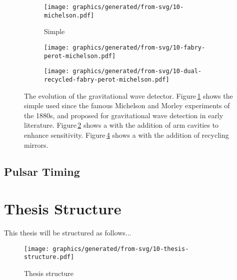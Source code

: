 \begin{figure}
  \begin{center}
    \begin{subfigure}{.3\textwidth}
      \texttt{[image: graphics/generated/from-svg/10-michelson.pdf]}
      \caption{Simple \MI}
      \label{fig:mi}
    \end{subfigure}
    \hfill
    \begin{subfigure}{.3\textwidth}
      \texttt{[image: graphics/generated/from-svg/10-fabry-perot-michelson.pdf]}
      \caption{\FPMI}
      \label{fig:fpmi}
    \end{subfigure}
    \hfill
    \begin{subfigure}{.3\textwidth}
      \texttt{[image: graphics/generated/from-svg/10-dual-recycled-fabry-perot-michelson.pdf]}
      \caption{\DRFPMI}
      \label{fig:drfpmi}
    \end{subfigure}
    \caption[The evolution of the gravitational wave detector]{The evolution of the gravitational wave detector. Figure\,\ref{fig:mi} shows the simple \MI used since the famous Michelson and Morley experiments of the 1880s, and proposed for gravitational wave detection in early literature. Figure\,\ref{fig:fpmi} shows a \MI with the addition of \FP arm cavities to enhance sensitivity. Figure\,\ref{fig:drfpmi} shows a \FPMI with the addition of recycling mirrors.}
  \end{center}
\end{figure}

\subsection{Pulsar Timing}

\section{Thesis Structure}

This thesis will be structured as follows...

\begin{figure}
  \texttt{[image: graphics/generated/from-svg/10-thesis-structure.pdf]}
  \caption{Thesis structure}
  \label{fig:thesis-structure}
\end{figure}
